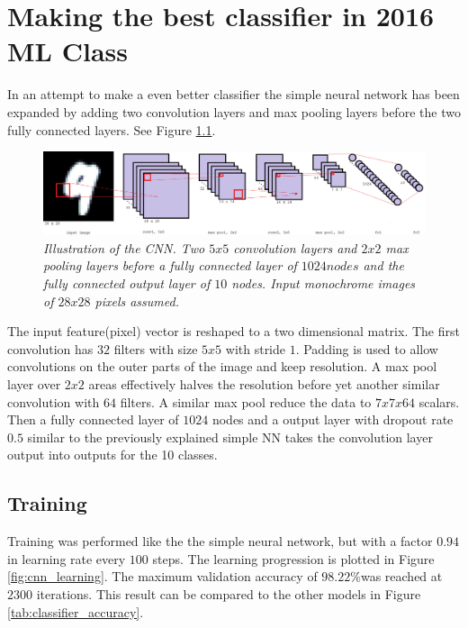 \documentclass[a4paper,10pt,article,oneside,english]{memoir}
\let\oldcaption\caption
\renewcommand{\caption}[1]{\oldcaption{\emph{#1}}}
\begin{document}
	
	
	
	
	
	
	
	\chapter{Making the best classifier in 2016 ML Class}
	In an attempt to make a even better classifier the simple neural network has been expanded by adding two convolution layers and max pooling layers before the two fully connected layers. See Figure \ref{fig:cnn_layout}.
	
	\begin{figure}[h!]
		\centering
		\includegraphics[width=0.9\linewidth]{cnn_layout.png}
		\caption{Illustration of the CNN. Two $5 x 5$ convolution layers and $2 x 2$ max pooling layers before a fully connected layer of $1024 nodes$ and the fully connected output layer of $10$ nodes. Input monochrome images of $28x28$ pixels assumed.}
		\label{fig:cnn_layout}
	\end{figure}
	
	The input feature(pixel) vector is reshaped to a two dimensional matrix. The first convolution has $32$ filters with size $5x5$ with stride $1$. Padding is used to allow convolutions on the outer parts of the image and keep resolution. A max pool layer over $2x2$ areas effectively halves the resolution before yet another similar convolution with $64$ filters. A similar max pool reduce the data to $7x7x64$ scalars. Then a fully connected layer of $1024$ nodes and a output layer with dropout rate $0.5$ similar to the previously explained simple NN takes the convolution layer output into outputs for the 10 classes. 
	
	
	
	
	\section{Training}
	Training was performed like the the simple neural network, but with a factor $0.94$ in learning rate every $100$ steps. The learning progression is plotted in Figure \ref{fig:cnn_learning}. 
	The maximum validation accuracy of $98.22\%$was reached at $2300$ iterations.
	This result can be compared to the other models in Figure \ref{tab:classifier_accuracy}. 
	
\end{document}
